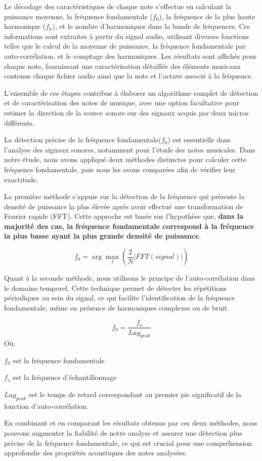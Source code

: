 Le décodage des caractéristiques de chaque note s'effectue en calculant la puissance moyenne, la fréquence fondamentale ($f_0$), la fréquence de la plus haute harmonique ($f_h$), et le nombre d'harmoniques dans la bande de fréquences. Ces informations sont extraites à partir du signal audio, utilisant diverses fonctions telles que le calcul de la moyenne de puissance, la fréquence fondamentale par auto-corrélation, et le comptage des harmoniques. Les résultats sont affichés pour chaque note, fournissant une caractérisation détaillée des éléments musicaux contenus chaque fichier audio ainsi que la note et l'octave associé à la fréquence. 

L'ensemble de ces étapes contribue à élaborer un algorithme complet de détection et de caractérisation des notes de musique, avec une option facultative pour estimer la direction de la source sonore sur des signaux acquis par deux micros différents. 

La détection précise de la fréquence fondamentale($f_0$) est essentielle dans l'analyse des signaux sonores, notamment pour l'étude des notes musicales. Dans notre étude, nous avons appliqué deux méthodes distinctes pour calculer cette fréquence fondamentale, puis nous les avons comparées afin de vérifier leur exactitude.

La première méthode s'appuie sur la détection de la fréquence qui présente la densité de puissance la plus élevée après avoir effectué une transformation de Fourier rapide (FFT). Cette approche est basée sur l'hypothèse que, \textbf{dans la majorité des cas, la fréquence fondamentale correspond à la fréquence la plus basse ayant la plus grande densité de puissance}.

\[
    f_0 = \arg\max_f(\frac{2}{N}|FFT(signal)|)
\]

Quant à la seconde méthode, nous utilisons le principe de l'auto-corrélation dans le domaine temporel. Cette technique permet de détecter les répétitions périodiques au sein du signal, ce qui facilite l'identification de la fréquence fondamentale, même en présence de harmoniques complexes ou de bruit.

\[
    f_0 = \frac{f_s}{Lag_{peak}}
\]
Où: 

$f_0$ est la fréquence fondamentale  

$f_s$ est la fréquence d'échantillonnage 

$Lag_{peak}$ est le temps de retard correspondant au premier pic significatif de la fonction d'auto-corrélation.

En combinant et en comparant les résultats obtenus par ces deux méthodes, nous pouvons augmenter la fiabilité de notre analyse et assurer une détection plus précise de la fréquence fondamentale, ce qui est crucial pour une compréhension approfondie des propriétés acoustiques des notes analysées.
